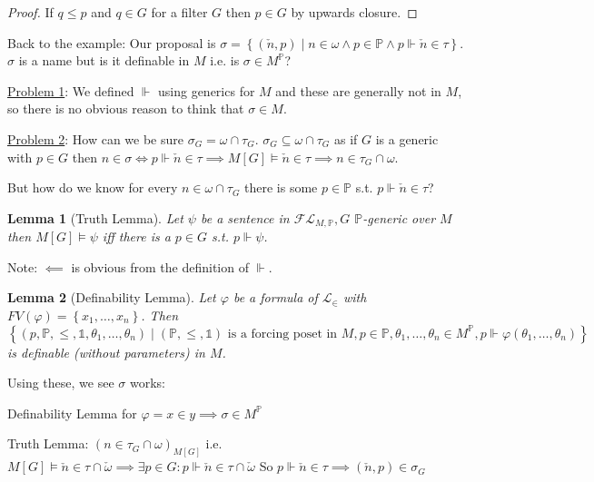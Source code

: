 \documentclass{scrartcl}
\renewcommand{\L}{\mathcal{L}}
\newcommand{\Le}{\L_\in}
\newcommand{\set}[1]{\left\{#1\right\}}
\theoremstyle{definition}
\theoremstyle{plain}
\newtheorem*{lemma*}{Lemma}
\theoremstyle{remark}
\begin{document}
	\begin{proof}
		If $q \leq p$ and $q \in G$ for a filter $G$ then $p \in G$ by upwards closure.
	\end{proof}

	Back to the example: Our proposal is $\sigma = \set{(\check{n}, p) \mid n \in \omega \land p \in \mathbb{P} \land p \Vdash \check{n} \in \tau}$.
	$\sigma$ is a name but is it definable in $M$ i.e. is $\sigma \in M^\mathbb{P}$?
	
	\underline{Problem 1}: We defined $\Vdash$ using generics for $M$ and these are generally not in $M$, so 
	there is no obvious reason to think that $\sigma \in M$.

	\underline{Problem 2}: How can we be sure $\sigma_G = \omega \cap \tau_G$. $\sigma_G \subseteq \omega \cap \tau_G$ as if 
	$G$ is a generic with $p \in G$ then $n \in \sigma \iff p \Vdash \check{n} \in \tau \implies M[G] \vDash \check{n} \in \tau \implies
	n \in \tau_G \cap \omega$.

	But how do we know for every $n \in \omega \cap \tau_G$ there is some $p \in \mathbb{P}$ s.t. $p \Vdash \check{n} \in \tau$?

	\begin{lemma*}[Truth Lemma]
		Let $\psi$ be a sentence in $\mathcal{FL}_{M, \mathbb{P}}, G$ $\mathbb{P}$-generic over $M$ then $M[G] \vDash \psi $ iff there
		is a $p \in G$ s.t. $p \Vdash \psi$.		
	\end{lemma*}

	Note: $\impliedby$ is obvious from the definition of $\Vdash$.

	\begin{lemma*}[Definability Lemma]
		Let $\varphi $ be a formula of $\Le$ with $FV(\varphi ) = \set{x_1, \dots, x_n}$. Then
		$\set{(p, \mathbb{P}, \leq, \mathbb{1}, \theta_1, \dots, \theta_n) \mid (\mathbb{P}, \leq, \mathbb{1}) \text{ is a forcing poset in } M, p \in \mathbb{P},
		\theta_1, \dots, \theta_n \in M^\mathbb{P}, p \Vdash \varphi(\theta_1, \dots, \theta_n)}$
		is definable (without parameters) in $M$.
	\end{lemma*}

	Using these, we see $\sigma$ works:

	Definability Lemma for $\varphi = x \in y \implies \sigma \in M^\mathbb{P}$

	Truth Lemma: $(n \in \tau_G \cap \omega)_{M[G]}$ i.e. $M[G] \vDash \check{n} \in \tau \cap \check{\omega} \implies \exists p \in G: p \Vdash \check{n} \in \tau \cap \check{\omega}$
	So $p \Vdash \check{n} \in \tau \implies (\check{n}, p ) \in \sigma_G$
\end{document}

